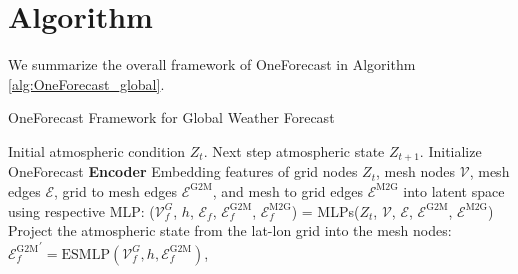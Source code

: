 \section{Algorithm}
    We summarize the overall framework of OneForecast in Algorithm \ref{alg:OneForecast_global}.


    \begin{algorithm}[ht]
        \caption{OneForecast Framework for Global Weather Forecast}
        \label{alg:OneForecast_global}
            \begin{algorithmic}[1]
                \renewcommand{\algorithmicrequire}{\textbf{Require:}}
        	\REQUIRE
        	Initial atmospheric condition $Z_t$.
        	\ENSURE
        	Next step atmospheric state $Z_{t+1}$.
                \STATE  Initialize OneForecast
                \REPEAT
                \STATE \textbf{Encoder}
                \STATE  Embedding features of grid nodes $Z_t$, mesh nodes $\mathcal{V}$, mesh edges $\mathcal{E}$, grid to mesh edges $\mathcal{E}^{\mathrm{G} 2 \mathrm{M}}$, and mesh to grid edges $\mathcal{E}^{\mathrm{M} 2 \mathrm{G}}$ into latent space using respective MLP: ($\mathcal{V}_f^G$, $h$, $\mathcal{E}_f$, $\mathcal{E}^{\mathrm{G} 2 \mathrm{M}}_f$, $\mathcal{E}^{\mathrm{M} 2 \mathrm{G}}_f$) = MLPs($Z_t$, $\mathcal{V}$, $\mathcal{E}$, $\mathcal{E}^{\mathrm{G} 2 \mathrm{M}}$, $\mathcal{E}^{\mathrm{M} 2 \mathrm{G}}$)
                \STATE Project the atmospheric state from the lat-lon grid into the mesh nodes: ${\mathcal{E}^{\mathrm{G} 2 \mathrm{M}}_f}^{\prime} = \mathrm{ESMLP}(\mathcal{V}_f^G, h, \mathcal{E}^{\mathrm{G} 2 \mathrm{M}}_f)$,


\end{algorithmic}
\end{algorithm}
